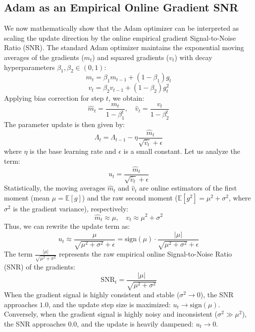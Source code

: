 \documentclass{article}
\theoremstyle{plain}
\theoremstyle{definition}
\theoremstyle{remark}
\begin{document}
\subsection{Adam as an Empirical Online Gradient SNR}
We now mathematically show that the Adam optimizer can be interpreted as scaling the update direction by the online empirical gradient Signal-to-Noise Ratio (SNR).
The standard Adam optimizer \cite{kingma14adam} maintains the exponential moving averages of the gradients ($m_t$) and squared gradients ($v_t$) with decay hyperparameters $\beta_1, \beta_2 \in (0, 1)$:
\begin{equation}
    m_t = \beta_1 m_{t-1} + (1 - \beta_1) g_t
\end{equation}
\begin{equation}
    v_t = \beta_2 v_{t-1} + (1 - \beta_2) g_t^2
\end{equation}
Applying bias correction for step $t$, we obtain:
\begin{equation}
    \hat{m}_t = \frac{m_t}{1 - \beta_1^t}, \quad \hat{v}_t = \frac{v_t}{1 - \beta_2^t}
\end{equation}
The parameter update is then given by:
\begin{equation}
    \Lambda_t = \Lambda_{t-1} - \eta \frac{\hat{m}_t}{\sqrt{\hat{v}_t} + \epsilon}
\end{equation}
where $\eta$ is the base learning rate and $\epsilon$ is a small constant. Let us analyze the term:
\begin{equation}
    u_t = \frac{\hat{m}_t}{\sqrt{\hat{v}_t} + \epsilon}
\end{equation}
Statistically, the moving averages $\hat{m}_t$ and $\hat{v}_t$ are online estimators of the first moment (mean $\mu = \mathbb{E}[g]$) and the raw second moment ($\mathbb{E}[g^2] = \mu^2 + \sigma^2$, where $\sigma^2$ is the gradient variance), respectively:
\begin{equation}
    \hat{m}_t \approx \mu, \quad \hat{v}_t \approx \mu^2 + \sigma^2
\end{equation}
Thus, we can rewrite the update term as:
\begin{equation}
    u_t \approx \frac{\mu}{\sqrt{\mu^2 + \sigma^2} + \epsilon} = \text{sign}(\mu) \cdot \frac{|\mu|}{\sqrt{\mu^2 + \sigma^2} + \epsilon}
\end{equation}
The term $\frac{|\mu|}{\sqrt{\mu^2 + \sigma^2}}$ represents the raw empirical online Signal-to-Noise Ratio (SNR) of the gradients:
\begin{equation}
    \text{SNR}_t = \frac{|\mu|}{\sqrt{\mu^2 + \sigma^2}}
\end{equation}
When the gradient signal is highly consistent and stable ($\sigma^2 \to 0$), the SNR approaches $1.0$, and the update step size is maximized: $u_t \to \text{sign}(\mu)$.
Conversely, when the gradient signal is highly noisy and inconsistent ($\sigma^2 \gg \mu^2$), the SNR approaches $0.0$, and the update is heavily dampened: $u_t \to 0$.
\end{document}
